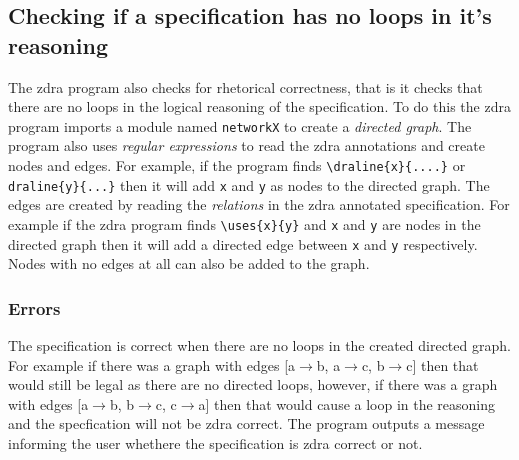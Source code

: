 \subsection{Checking if a specification has no loops in it's reasoning}
\label{subsec:loops}

The \gls{zdra} program also checks for rhetorical correctness, that is it checks that there are no loops in the logical reasoning of the specification. To do this the \gls{zdra} program imports a module named \texttt{networkX} to create a \emph{directed graph}. The program also uses \emph{regular expressions} to read the \gls{zdra} annotations and create nodes and edges. For example, if the program finds \verb|\draline{x}{....}| or \verb|draline{y}{...}| then it will add \texttt{x} and \texttt{y} as nodes to the directed graph. The edges are created by reading the \emph{relations} in the \gls{zdra} annotated specification. For example if the \gls{zdra} program finds \verb|\uses{x}{y}| and \texttt{x} and \texttt{y} are nodes in the directed graph then it will add a directed edge between \texttt{x} and \texttt{y} respectively. Nodes with no edges at all can also be added to the graph.

\subsubsection{Errors}
\label{subsubsec:zdra_looperrors}

The specification is correct when there are no loops in the created directed graph. For example if there was a graph with edges [a$\rightarrow$b, a$\rightarrow$c, b$\rightarrow$c] then that would still be legal as there are no directed loops, however, if there was a graph with edges [a$\rightarrow$b, b$\rightarrow$c, c$\rightarrow$a] then that would cause a loop in the reasoning and the specfication will not be \gls{zdra} correct. The program outputs a message informing the user whethere the specification is \gls{zdra} correct or not.

